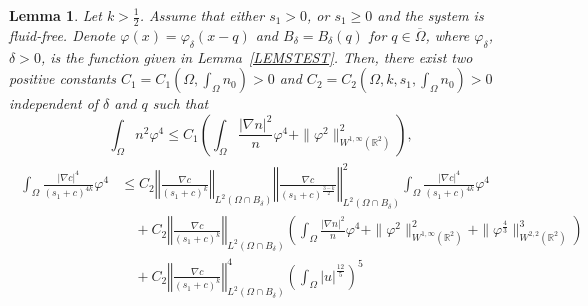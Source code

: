 \documentclass[10pt,a4paper]{amsart}
\newtheorem{lemma}{Lemma}
\newcommand{\R}{{ \mathbb{R}  }}
\newcommand{\bke}[1]{\left( #1 \right)}
\newcommand{\norm}[1]{\left\Vert #1 \right\Vert}
\begin{document}
\begin{lemma}\label{LEMLOCINT}
Let $k>\frac{1}{2}$.
Assume that either $s_{1}>0$, or $s_{1}\ge0$ and the system is fluid-free.
Denote $\varphi(x)=\varphi_{\delta}(x-q)$ and $B_{\delta}=B_{\delta}(q)$  for $q\in\overline{\Omega}$, where $\varphi_{\delta}$, $\delta>0$,  is the function given in   Lemma~\ref{LEMSTEST}. 
Then, there exist two positive constants $C_{1}=C_1(\Omega, \int_{\Omega} n_0) >0$ and  $C_2=C_2(\Omega, k, s_1, \int_{\Omega} n_0)>0$ independent of $\delta$ and $q$  such that
\begin{equation}\label{LEMLOCINT1}
\int_{\Omega}n^{2}\varphi^{4}
 \le C_{1} \bke{  \int_{\Omega} \frac{|\nabla n|^{2}}{n}\varphi^{4}  +\| \varphi^{2}  \|_{W^{1,\infty}(\R^{2})}^{2}},
\end{equation}
\begin{align}\label{LEMLOCINT2}
\begin{aligned} 
 \int_{\Omega} \frac{|\nabla c|^{4}}{(s_{1}+c)^{4k}}\varphi^{4}
 &\le  C_{2}\norm{\frac{\nabla c}{(s_{1}+c)^{k}}}_{L^{2}(\Omega\cap B_{\delta})} \norm{\frac{\nabla c}{(s_{1}+c)^{\frac{3-k}{2}}}}_{L^{2}(\Omega\cap B_{\delta})}^{2}  \int_{\Omega} \frac{|\nabla c|^{4}}{(s_{1}+c)^{4k}}\varphi^{4}
   \\
 &\quad +  C_{2}\norm{\frac{\nabla c}{(s_{1}+c)^{k}}}_{L^{2}(\Omega\cap B_{\delta})}
\bke{   \int_{\Omega} \frac{|\nabla n|^{2}}{n}\varphi^{4}  +\| \varphi^{2}  \|_{W^{1,\infty}(\R^{2})}^{2}  +\|\varphi^{\frac{4}{3}}\|_{W^{2,2}(\R^{2})}^{3}} \\
&\quad +C_{2} \norm{\frac{\nabla c}{(s_{1}+c)^{k}}}^{4}_{L^{2}(\Omega\cap B_{\delta})} \bke{\int_{\Omega}|u|^{\frac{12}{5}} }^{5}
\end{aligned}
\end{align}
\end{lemma}
\end{document}
